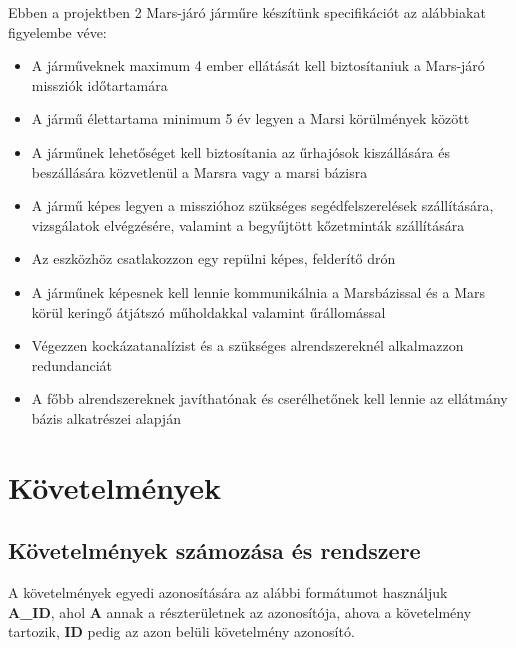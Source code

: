 \documentclass[12pt]{report}
\begin{document}
Ebben a projektben 2 Mars-járó járműre készítünk specifikációt az alábbiakat figyelembe véve:
\begin{itemize}
  \item A járműveknek maximum 4 ember ellátását kell biztosítaniuk a Mars-járó missziók
időtartamára
  \item A jármű élettartama minimum 5 év legyen a Marsi körülmények között
  \item A járműnek lehetőséget kell biztosítania az űrhajósok kiszállására és beszállására
közvetlenül a Marsra vagy a marsi bázisra
  \item A jármű képes legyen a misszióhoz szükséges segédfelszerelések szállítására, vizsgálatok
elvégzésére, valamint a begyűjtött kőzetminták szállítására
  \item Az eszközhöz csatlakozzon egy repülni képes, felderítő drón
  \item A járműnek képesnek kell lennie kommunikálnia a Marsbázissal és a Mars körül keringő
átjátszó műholdakkal valamint űrállomással
  \item Végezzen kockázatanalízist és a szükséges alrendszereknél alkalmazzon redundanciát
  \item A főbb alrendszereknek javíthatónak és cserélhetőnek kell lennie az ellátmány bázis
alkatrészei alapján
\end{itemize}

\chapter{Követelmények}
\section{Követelmények számozása és rendszere}
A követelmények egyedi azonosítására az alábbi formátumot használjuk \\ 
\textbf{A_ID}, ahol \textbf{A} annak a részterületnek az azonosítója, ahova a követelmény tartozik, \textbf{ID} pedig az azon belüli követelmény azonosító.
\end{document}
